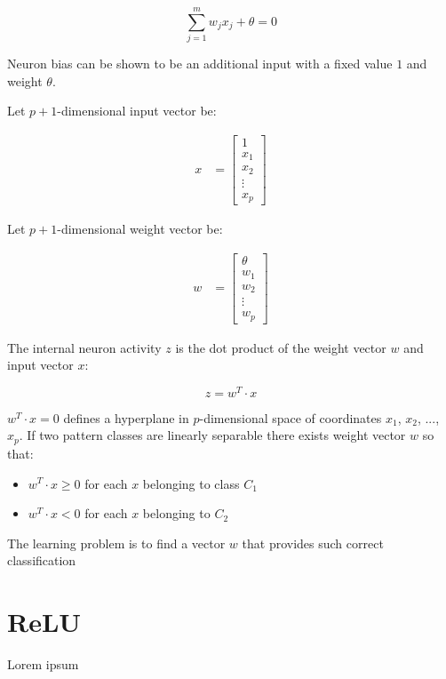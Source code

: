 $$
\sum_{j=1}^{m} w_j x_j + \theta = 0
$$

Neuron bias can be shown to be an additional input with a fixed value $1$ and weight $\theta$.

Let $p+1$-dimensional input vector be:

\begin{align}
x &= \begin{bmatrix}
    1 \\
    x_{1} \\
    x_{2} \\
    \vdots \\
    x_{p}
    \end{bmatrix}
\end{align}

Let $p+1$-dimensional weight vector be:

\begin{align}
w &= \begin{bmatrix}
    \theta \\
    w_{1} \\
    w_{2} \\
    \vdots \\
    w_{p}
    \end{bmatrix}
\end{align}

The internal neuron activity $z$ is the dot product of the weight vector $w$ and input vector $x$:

$$
z = w^T \cdot x
$$

$w^T \cdot x = 0$ defines a hyperplane in $p$-dimensional space of coordinates $x_1$, $x_2$, ..., $x_p$. If two pattern classes are linearly separable there exists weight vector $w$ so that:

\begin{itemize}
    \item $w^T \cdot x \geq 0$ for each $x$ belonging to class $C_1$
    \item $w^T \cdot x < 0$ for each $x$ belonging to $C_2$
\end{itemize}

The learning problem is to find a vector $w$ that provides such correct classification

\section{ReLU}
Lorem ipsum
